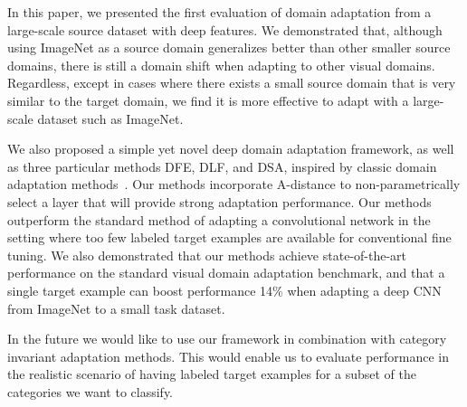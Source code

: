 In this paper, we presented the first evaluation of domain adaptation from a
large-scale source dataset with deep features. We demonstrated that, although
using ImageNet as a source domain generalizes better than other smaller source
domains, there is still a domain shift when adapting to other visual domains.
Regardless, except in cases where there exists a small source domain that is
very similar to the target domain, we find it is more effective to adapt with
a large-scale dataset such as ImageNet.

We also proposed a simple yet novel deep domain adaptation framework, as well as
three particular methods DFE, DLF, and DSA, inspired by classic domain
adaptation methods~\cite{daume, sa}. Our methods incorporate A-distance to
non-parametrically select a layer that will provide strong adaptation
performance. Our methods outperform the standard method of adapting a
convolutional network in the setting where too few labeled target examples are
available for conventional fine tuning. We also demonstrated that our methods
achieve state-of-the-art performance on the standard visual domain adaptation
benchmark, and that a single target example can boost performance 14\% when
adapting a deep CNN from ImageNet to a small task dataset.

In the future we would like to use our framework in combination with category invariant adaptation methods. This would enable us to evaluate performance in the realistic scenario of having labeled target examples for a subset of the categories we want to classify. 
